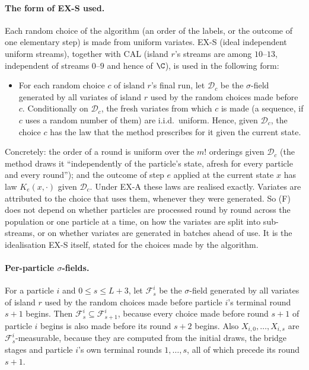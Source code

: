 \documentclass[11pt]{report}
\begin{document}
\paragraph{The form of EX-S used.} Each random choice of the algorithm (an order of the labels, or the outcome of one elementary step) is made from uniform variates. EX-S (ideal independent uniform streams), together with CAL (island $r$'s streams are among $10$--$13$, independent of streams $0$--$9$ and hence of $\C$), is used in the following form:
\begin{itemize}
\item[(F)] For each random choice $c$ of island $r$'s final run, let $\mathcal D_c$ be the $\sigma$-field generated by all variates of island $r$ used by the random choices made before $c$. Conditionally on $\mathcal D_c$, the fresh variates from which $c$ is made (a sequence, if $c$ uses a random number of them) are i.i.d.\ uniform. Hence, given $\mathcal D_c$, the choice $c$ has the law that the method prescribes for it given the current state.
\end{itemize}
Concretely: the order of a round is uniform over the $m!$ orderings given $\mathcal D_c$ (the method draws it ``independently of the particle's state, afresh for every particle and every round''); and the outcome of step $e$ applied at the current state $x$ has law $K_e(x,\cdot)$ given $\mathcal D_c$. Under EX-A these laws are realised exactly. Variates are attributed to the choice that uses them, whenever they were generated. So (F) does not depend on whether particles are processed round by round across the population or one particle at a time, on how the variates are split into sub-streams, or on whether variates are generated in batches ahead of use. It is the idealisation EX-S itself, stated for the choices made by the algorithm.

\paragraph{Per-particle $\sigma$-fields.} For a particle $i$ and $0\le s\le L+3$, let $\mathcal F^i_s$ be the $\sigma$-field generated by all variates of island $r$ used by the random choices made before particle $i$'s terminal round $s+1$ begins. Then $\mathcal F^i_s\subseteq\mathcal F^i_{s+1}$, because every choice made before round $s+1$ of particle $i$ begins is also made before its round $s+2$ begins. Also $X_{i,0},\dots,X_{i,s}$ are $\mathcal F^i_s$-measurable, because they are computed from the initial draws, the bridge stages and particle $i$'s own terminal rounds $1,\dots,s$, all of which precede its round $s+1$.
\end{document}
